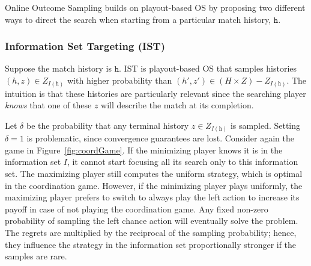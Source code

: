 \documentclass[letterpaper]{article}
\newcommand{\tth}{\mathtt{h}}
\newcounter{vlNoteCounter}
\newcommand{\vlnote}[1]{{\scriptsize \color{blue} $\blacksquare$ \refstepcounter{vlNoteCounter}\textsf{[VL]$_{\arabic{vlNoteCounter}}$:{#1}}}}
\begin{document}
Online Outcome Sampling builds on playout-based OS by proposing two different ways to direct the search when starting from a particular
match history, $\tth$. 

\subsubsection{Information Set Targeting (IST)}

Suppose the match history is $\tth$. IST is playout-based OS that samples histories $(h,z) \in Z_{I(\tth)}$ 
with higher probability than $(h',z') \in (H \times Z) - Z_{I(\tth)}$. The intuition is that these histories are particularly 
relevant since the searching player {\it knows} that one of these $z$ will describe the match at its completion. 

Let $\delta$ be 
the probability that any terminal history $z \in Z_{I(\tth)}$ is sampled.
Setting $\delta = 1$ is problematic, since convergence guarantees are lost.
Consider again the game in Figure~\ref{fig:coordGame}. 
If the minimizing player knows it is in the information set $I$, it cannot start focusing all its 
search only to this information set. The maximizing player still computes the uniform strategy, which is optimal in the coordination game. 
However, if the minimizing player plays uniformly, the maximizing player prefers to switch to always play the left action to increase its payoff in case of not playing the coordination game. Any fixed non-zero probability of sampling the left chance action will 
eventually solve the problem. The regrets are multiplied by the reciprocal of the sampling probability; hence, they influence the strategy 
in the information set proportionally stronger if the samples are rare. 

\end{document}
